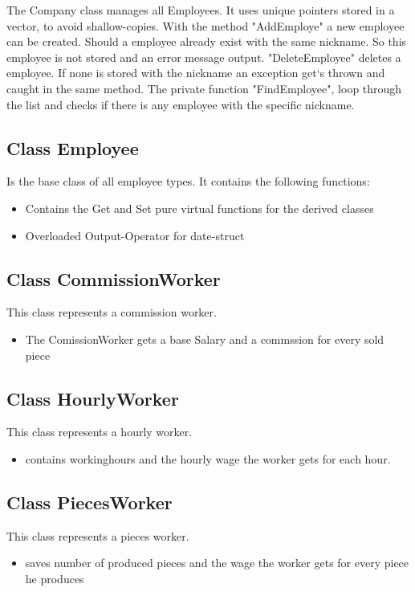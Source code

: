 The Company class manages all Employees. It uses unique pointers stored in a vector, to avoid shallow-copies.
With the method "AddEmploye" a new employee can be created. Should a employee already exist with the same nickname. So this employee is not stored and an error message output.
"DeleteEmployee" deletes a employee. If none is stored with the nickname an exception get`s thrown and caught in the same method.
The private function "FindEmployee", loop through the list and checks if there is any employee with the specific nickname.

\subsection{Class Employee}
Is the base class of all employee types.
It contains the following functions:
\begin{itemize}
	\item Contains the Get and Set pure virtual functions for the derived classes
	\item Overloaded Output-Operator for date-struct
\end{itemize}

\subsection{Class CommissionWorker}
This class represents a commission worker.
\begin{itemize}
	\item The ComissionWorker gets a base Salary and a commssion for every sold piece
\end{itemize}

\subsection{Class HourlyWorker}
This class represents a hourly worker.
\begin{itemize}
	\item contains workinghours and the hourly wage the worker gets for each hour.
\end{itemize}

\subsection{Class PiecesWorker}
This class represents a pieces worker.
\begin{itemize}
	\item saves number of produced pieces and the wage the worker gets for every piece he produces
	
\end{itemize}

